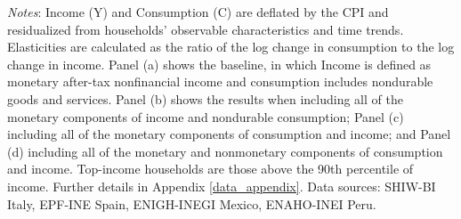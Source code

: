 \documentclass[12pt]{article}
\begin{document}
\begin{spacing}{1.5}
\begin{table}[H]
\raggedright{}\textit{\footnotesize{}Notes}{\footnotesize{}:
Income (Y) and Consumption (C) are deflated by the CPI and residualized from households' observable characteristics and time trends. Elasticities are calculated as the ratio of the log change in consumption to the log change in income. Panel (a) shows the baseline, in which Income is defined as monetary after-tax nonfinancial income and consumption includes nondurable goods and services. Panel (b) shows the results when including all of the monetary components of income and nondurable consumption; Panel (c) including all of the monetary components of consumption and income; and Panel (d) including all of the monetary and nonmonetary components of consumption and income. Top-income households are those above the 90th percentile of income. Further details in Appendix \ref{data_appendix}. Data sources:  SHIW-BI Italy, EPF-INE Spain, ENIGH-INEGI Mexico, ENAHO-INEI Peru. }{\footnotesize\par}
\end{table}


\begin{table}[H]
\begin{centering}
\caption{Consumption-income Elasticities: Synthetic Cohort and Panel
{\label{tab_elasticities_crosssec_panel}}}
\vspace*{-0.2em}
  \\
\par\end{centering}
\medskip{}


\end{table}
\end{spacing}
\end{document}
